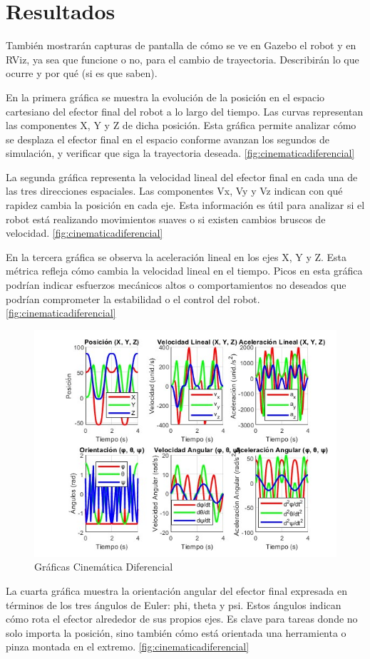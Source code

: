 \chapter{Resultados} \label{chap:resultados}

También mostrarán capturas de pantalla de cómo se ve en Gazebo el robot y en RViz, ya sea que funcione o no, para el cambio de trayectoria. Describirán lo que ocurre y por qué (si es que saben).

En la primera gráfica se muestra la evolución de la posición en el espacio cartesiano del efector final del robot a lo largo del tiempo. Las curvas representan las componentes X, Y y Z de dicha posición. Esta gráfica permite analizar cómo se desplaza el efector final en el espacio conforme avanzan los segundos de simulación, y verificar que siga la trayectoria deseada. \autoref{fig:cinematicadiferencial}

La segunda gráfica representa la velocidad lineal del efector final en cada una de las tres direcciones espaciales. Las componentes Vx, Vy y Vz indican con qué rapidez cambia la posición en cada eje. Esta información es útil para analizar si el robot está realizando movimientos suaves o si existen cambios bruscos de velocidad. \autoref{fig:cinematicadiferencial}

En la tercera gráfica se observa la aceleración lineal en los ejes X, Y y Z. Esta métrica refleja cómo cambia la velocidad lineal en el tiempo. Picos en esta gráfica podrían indicar esfuerzos mecánicos altos o comportamientos no deseados que podrían comprometer la estabilidad o el control del robot. \autoref{fig:cinematicadiferencial}


\begin{figure}
	\centering
	\includegraphics[width=0.5
	\linewidth]{img/cinematicadiferencial}
	\caption{Gráficas Cinemática Diferencial}
	\label{fig:cinematicadiferencial}
\end{figure}

La cuarta gráfica muestra la orientación angular del efector final expresada en términos de los tres ángulos de Euler: phi, theta y psi. Estos ángulos indican cómo rota el efector alrededor de sus propios ejes. Es clave para tareas donde no solo importa la posición, sino también cómo está orientada una herramienta o pinza montada en el extremo. \autoref{fig:cinematicadiferencial}

